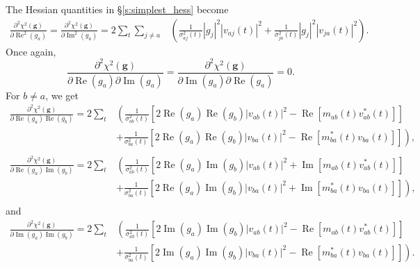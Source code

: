 \documentclass{article}
\newcommand\re{\operatorname{Re}}
\newcommand\im{\operatorname{Im}}
\begin{document}
The Hessian quantities in \S\ref{s:simplest_hess} become
\begin{equation}
\begin{split}
    \frac{\partial^2 \chi^2(\boldsymbol{g})}{\partial \re^2(g_a)} = \frac{\partial^2 \chi^2(\boldsymbol{g})}{\partial \im^2(g_a)} = 2 \sum_t \sum_{j \ne a} 
    & \left( \frac{1}{\sigma_{aj}^2(t)} |g_j|^2 |v_{aj}(t)|^2 + \frac{1}{\sigma_{ja}^2(t)} |g_j|^2 |v_{ja}(t)|^2 \right).
\end{split}
\end{equation}
Once again,
\begin{equation}
\frac{\partial^2 \chi^2(\boldsymbol{g})}{\partial \re(g_a) \partial \im(g_a)} = \frac{\partial^2 \chi^2(\boldsymbol{g})}{\partial \im(g_a) \partial \re(g_a)} = 0.
\end{equation}
For $b \ne a$, we get
\begin{equation}
\begin{split}
    \frac{\partial^2 \chi^2(\boldsymbol{g})}{\partial \re(g_a) \re(g_b)} = 2 \sum_t
    &\left( \frac{1}{\sigma_{ab}^2(t)} \left[ 2 \re(g_a) \re(g_b) |v_{ab}(t)|^2 - \re[m_{ab}(t) v_{ab}^*(t)] \right] \right. \\
    &\left. + \frac{1}{\sigma_{ba}^2(t)} \left[ 2\re(g_a) \re(g_b) |v_{ba}(t)|^2 - \re[m_{ba}^*(t) v_{ba}(t)] \right] \right), \\
\end{split}
\end{equation}
\begin{equation}
\begin{split}
    \frac{\partial^2 \chi^2(\boldsymbol{g})}{\partial \re(g_a) \im(g_b)} = 2 \sum_t
    &\left( \frac{1}{\sigma_{ab}^2(t)} \left[ 2 \re(g_a) \im(g_b) |v_{ab}(t)|^2 + \im[m_{ab}(t) v_{ab}^*(t)] \right] \right. \\
    &\left. + \frac{1}{\sigma_{ba}^2(t)} \left[ 2\re(g_a) \im(g_b) |v_{ba}(t)|^2 + \im[m_{ba}^*(t) v_{ba}(t)] \right] \right), \\
\end{split}
\end{equation}
and
\begin{equation}
\begin{split}
    \frac{\partial^2 \chi^2(\boldsymbol{g})}{\partial \im(g_a) \im(g_b)} = 2 \sum_t
    &\left( \frac{1}{\sigma_{ab}^2(t)} \left[ 2 \im(g_a) \im(g_b) |v_{ab}(t)|^2 - \re[m_{ab}(t) v_{ab}^*(t)] \right] \right. \\
    &\left. + \frac{1}{\sigma_{ba}^2(t)} \left[ 2\im(g_a) \im(g_b) |v_{ba}(t)|^2 - \re[m_{ba}^*(t) v_{ba}(t)] \right] \right). \\
\end{split}
\end{equation}
\end{document}
